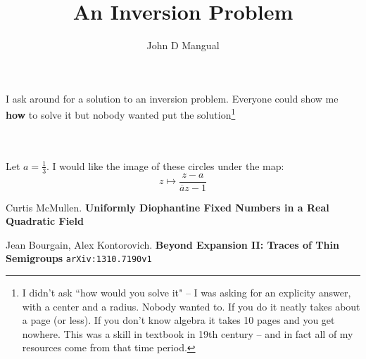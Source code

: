 \documentclass[12pt]{article}
\title{\textbf{ An Inversion Problem }}
\author{John D Mangual}
\date{}
\begin{document}
\selectfont \fontsize{24}{30}\selectfont

\maketitle

\noindent I ask around for a solution to an inversion problem.  Everyone could show me \textbf{how} to solve it but nobody wanted put the solution\footnote{I didn't ask ``how would you solve it" -- I was asking for an explicity answer, with a center and a radius.  Nobody wanted to.  If you do it neatly takes about a page (or less).  If you don't know algebra it takes 10 pages and you get nowhere.  This was a skill in textbook in 19th century -- and in fact all of my resources come from that time period.} \\ \\
 \\ 
Let $a = \frac{1}{3}$.  I would like the image of these circles under the map:
$$ z \mapsto \frac{z - a}{\overline{a}z-1} $$


\newpage

\selectfont \fontsize{12}{10}\selectfont

\begin{thebibliography}{}

\item Curtis McMullen.  \textbf{Uniformly Diophantine Fixed Numbers in a Real Quadratic Field}

\item Jean Bourgain, Alex Kontorovich.
\textbf{Beyond Expansion II: Traces of Thin Semigroups} \texttt{arXiv:1310.7190v1}

\end{thebibliography}
\end{document}
